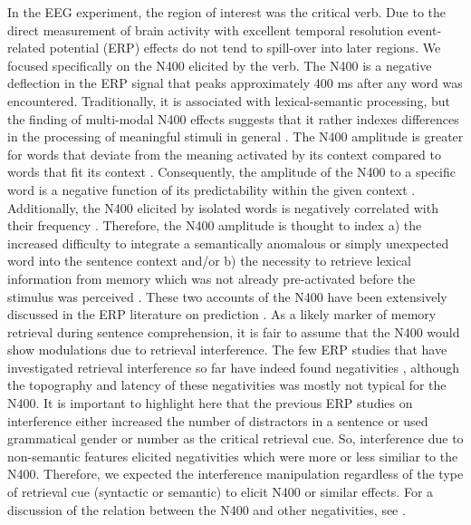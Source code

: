 \documentclass[review,preprint,12pt,authoryear,floatsintext]{elsarticle}
\begin{document}
{In the EEG experiment, the region of interest was the critical verb. Due to the direct measurement of brain activity with excellent temporal resolution event-related potential (ERP) effects do not tend to spill-over into later regions. We focused specifically on the N400 elicited by the verb. The N400 is a negative deflection in the ERP signal that peaks approximately 400 ms after any word was encountered. Traditionally, it is associated with lexical-semantic processing, but the finding of multi-modal N400 effects suggests that it rather indexes differences in the processing of meaningful stimuli in general \citep{kutas_federmeier2011}. The N400 amplitude is greater for words that deviate from the meaning activated by its context compared to words that fit its context \citep[see e.g.,][]{kutas_hillyard, Kutas_Iragui_1998}. Consequently, the amplitude of the N400 to a specific word is a negative function of its predictability within the given context \citep[see e.g.,][]{kutas_hillyard1984, frank2015_erp_surprisal}. Additionally, the N400 elicited by isolated words is negatively correlated with their frequency \citep{kutas&federmeier_2000}. Therefore, the N400 amplitude is thought to index a) the increased difficulty to integrate a semantically anomalous or simply unexpected word into the sentence context \citep[e.g.,][]{hagoort2004integration} and/or b) the necessity to retrieve lexical information from memory which was not already pre-activated before the stimulus was perceived \citep[e.g.,][]{brouwer2017_n4_p6}. These two accounts of the N400 have been extensively discussed in the ERP literature on prediction \citep[see e.g.,][]{nieuwland_etal_2018, nicenboim_etal_2020, Freunberger_Roehm_2017, Delong_etal_2005, mantegna2019, nieuwland2019_integrationprediction}. As a likely marker of memory retrieval during sentence comprehension, it is fair to assume that the N400 would show modulations due to retrieval interference. The few ERP studies that have investigated retrieval interference so far have indeed found negativities \citep{lee_garnsey, martinetal2014, schoknecht2022, vasishth_drenhaus_2011}, although the topography and latency of these negativities was mostly not typical for the N400. It is important to highlight here that the previous ERP studies on interference either increased the number of distractors in a sentence or used grammatical gender or number as the critical retrieval cue. So, interference due to non-semantic features elicited negativities which were more or less similiar to the N400. Therefore, we expected the interference manipulation regardless of the type of retrieval cue (syntactic or semantic) to elicit N400 or similar effects. For a discussion of the relation between the N400 and other negativities, see \cite{ina_n400}.

}
\end{document}
